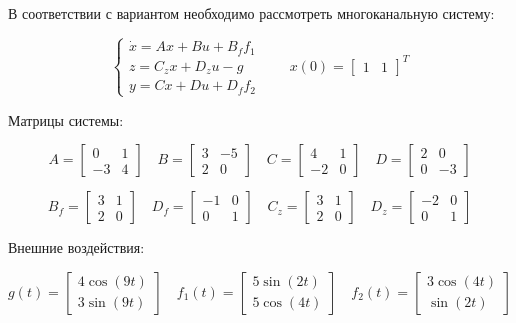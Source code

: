 \documentclass[a4paper,12pt]{article}
\begin{document}
	В соответствии с вариантом необходимо рассмотреть многоканальную систему:
	
	\[
	\begin{cases}
		\dot{x} = Ax + Bu + B_f f_1 \\
		z = C_z x + D_z u - g \\
		y = Cx + Du + D_f f_2
	\end{cases}
	\qquad
	x(0) = \begin{bmatrix} 1 & 1 \end{bmatrix}^T
	\]
	
	Матрицы системы:
	
	\[
	A = \begin{bmatrix}
		0 & 1 \\
		-3 & 4
	\end{bmatrix}
	\quad
	B = \begin{bmatrix}
		3 & -5 \\
		2 & 0
	\end{bmatrix}
	\quad
	C = \begin{bmatrix}
		4 & 1 \\
		-2 & 0
	\end{bmatrix}
	\quad
	D = \begin{bmatrix}
		2 & 0 \\
		0 & -3
	\end{bmatrix}
	\]
	
	\[
	B_f = \begin{bmatrix}
		3 & 1 \\
		2 & 0
	\end{bmatrix}
	\quad
	D_f = \begin{bmatrix}
		-1 & 0 \\
		0 & 1
	\end{bmatrix}
	\quad
	C_z = \begin{bmatrix}
		3 & 1 \\
		2 & 0
	\end{bmatrix}
	\quad
	D_z = \begin{bmatrix}
		-2 & 0 \\
		0 & 1
	\end{bmatrix}
	\]
	
	Внешние воздействия:
	
	\[
	g(t) = \begin{bmatrix}
		4\cos(9t) \\
		3\sin(9t)
	\end{bmatrix}\quad
	f_1(t) = \begin{bmatrix}
		5\sin(2t) \\
		5\cos(4t)
	\end{bmatrix}
	\quad
	f_2(t) = \begin{bmatrix}
		3\cos(4t) \\
		\sin(2t)
	\end{bmatrix}
	\]
	
\end{document}
